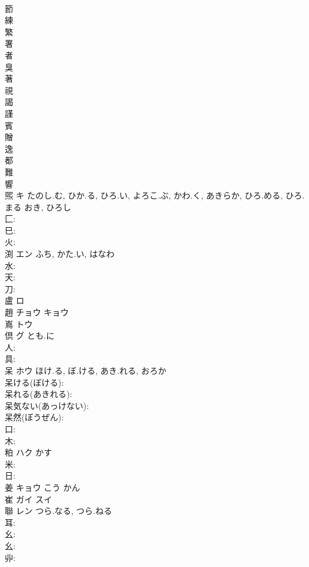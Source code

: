 \documentclass[8pt]{extreport}
\begin{document}
\begin{CJK}{UTF8}{min}
\\	節						
\\	練						
\\	繁						
\\	署						
\\	者						
\\	臭						
\\	著						
\\	視						
\\	謁						
\\	謹						
\\	賓						
\\	贈						
\\	逸						
\\	都						
\\	難						
\\	響						
\\	煕	キ	たのし.む, ひか.る, ひろ.い, よろこ.ぶ, かわ.く, あきらか, ひろ.める, ひろ.まる	おき, ひろし	
\\	匚: 
\\	巳: 
\\	火: 
\\	渕	エン	ふち, かた.い, はなわ		
\\	水: 
\\	天: 
\\	刀: 
\\	盧	ロ			
\\	趙	チョウ キョウ			
\\	嶌	トウ			
\\	倶	グ	とも.に		
\\	人: 
\\	具: 
\\	呆	ホウ	ほけ.る, ぼ.ける, あき.れる, おろか		
\\	呆ける(ぼける): 
\\	呆れる(あきれる): 
\\	呆気ない(あっけない): 
\\	呆然(ぼうぜん): 
\\	口: 
\\	木: 
\\	粕	ハク	かす		
\\	米: 
\\	日: 
\\	姜	キョウ こう かん			
\\	崔	ガイ スイ			
\\	聯	レン	つら.なる, つら.ねる		
\\	耳: 
\\	幺: 
\\	幺: 
\\	丱: 

\end{CJK}
\end{document}
